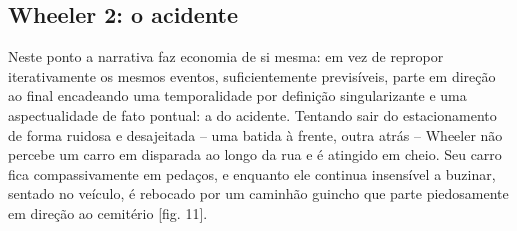 \begin{multicols}{2}
\section*{Wheeler 2:\allowbreak{} o acidente}
\par{}Neste ponto a narrativa faz economia de si mesma:\allowbreak{} em vez de repropor iterativamente os mesmos eventos,\allowbreak{} suficientemente previsíveis,\allowbreak{} parte em direção ao final encadeando uma temporalidade por definição singularizante e uma aspectualidade de fato pontual:\allowbreak{} a do acidente.\allowbreak{} Tentando sair do estacionamento de forma ruidosa e desajeitada – uma batida à frente,\allowbreak{} outra atrás – Wheeler não percebe um carro em disparada ao longo da rua e é atingido em cheio.\allowbreak{} Seu carro fica compassivamente em pedaços,\allowbreak{} e enquanto ele continua insensível a buzinar,\allowbreak{} sentado no veículo,\allowbreak{} é rebocado por um caminhão guincho que parte piedosamente em direção ao cemitério [fig.\allowbreak{} 11].\allowbreak{}
\par
{
}
\par


\end{multicols}

